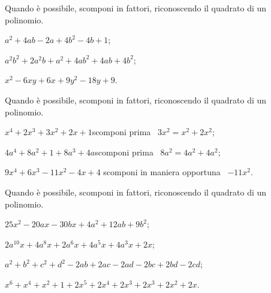 \begin{esercizio}[\Ast]
\label{ese:16.17}
Quando è possibile, scomponi in fattori, riconoscendo il quadrato di un polinomio.
\begin{enumeratea}
 \item $a^{2}+4ab-2a+4b^{2}-4b+1$;
 \item $a^{2}b^{2}+2a^{2}b+a^{2}+4ab^{2}+4ab+4b^{2}$;
 \item $x^{2}-6xy+6x+9y^{2}-18y+9$.
\end{enumeratea}
\end{esercizio}

\begin{esercizio}
\label{ese:16.18}
Quando è possibile, scomponi in fattori, riconoscendo il quadrato di un polinomio.
\begin{enumeratea}
 \item $x^{4}+2x^{3}+3x^{2}+2x+1$\quad  scomponi prima \quad~$3x^{2}=x^{2}+2x^{2}$;
 \item $4a^{4}+8a^{2}+1+8a^{3}+4a$\quad  scomponi prima \quad~$8a^{2}=4a^{2}+4a^{2}$;
 \item $9x^{4}+6x^{3}-11x^{2}-4x+4$ \quad scomponi in maniera opportuna \quad~$-11x^{2}$.
\end{enumeratea}
\end{esercizio}

\begin{esercizio}
\label{ese:16.19}
Quando è possibile, scomponi in fattori, riconoscendo il quadrato di un polinomio.
\begin{enumeratea}
 \item $25x^{2}-20ax-30bx+4a^{2}+12ab+9b^{2}$;
 \item $2a^{10}x+4a^{8}x+2a^{6}x+4a^{5}x+4a^{3}x+2x$;
 \item $a^{2}+b^{2}+c^{2}+d^{2}-2ab+2ac-2ad-2bc+2bd-2cd$;
 \item $x^{6}+x^{4}+x^{2}+1+2x^{5}+2x^{4}+2x^{3}+2x^{3}+2x^{2}+2x$.
\end{enumeratea}
\end{esercizio}

